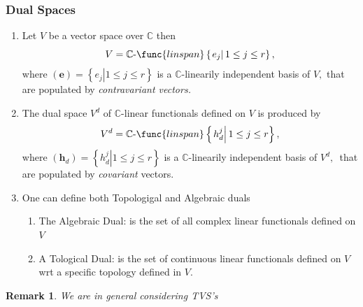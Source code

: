 \documentclass[aps,preprint]{revtex4}
\newtheorem{remark}[theorem]{Remark}
\begin{document}
\subsubsection{Dual Spaces}

\begin{enumerate}
\item \bigskip Let $V$ be a vector space over $\mathbb{C}$ then%
\begin{equation}
V=\mathbb{C}\text{-}\func{linspan}\left\{ \left. e_{j}\right\vert 1\leq
j\leq r\right\} ,
\end{equation}%
where $\left( \boldsymbol{e}\right) =\left\{ \left. e_{j}\right\vert 1\leq
j\leq r\right\} $ is a $\mathbb{C}$-linearily independent basis of $V,$ that
are populated by \emph{contravariant vectors.}

\item The dual space $V^{d}$ of $\mathbb{C}$-linear functionals defined on $%
V $ is produced by 
\begin{equation}
V^{d}=\mathbb{C}\text{-}\func{linspan}\left\{ \left. h_{d}^{j}\right\vert
1\leq j\leq r\right\} ,
\end{equation}%
where $\left( \boldsymbol{h}_{d}\right) =\left\{ \left. h_{d}^{j}\right\vert
1\leq j\leq r\right\} $ is a $\mathbb{C}$-linearily independent basis of $%
V^{d},$\emph{\ }that are populated by \emph{covariant} vectors.

\item One can define both Topologigal and Algebraic duals

\begin{enumerate}
\item The Algebraic Dual: is the set of all complex linear functionals
defined on $V$

\item A Tological Dual: is the set of continuous linear functionals defined
on $V$ wrt a specific topology defined in $V.$
\end{enumerate}
\end{enumerate}

\begin{remark}
We are in general considering TVS's
\end{remark}
\end{document}
